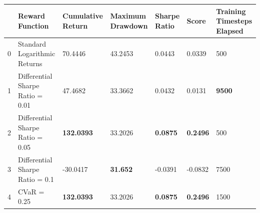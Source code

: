 \begin{tabular}{lllllll}
\toprule
 & Reward Function & Cumulative Return & Maximum Drawdown & Sharpe Ratio & Score & Training Timesteps Elapsed \\
\midrule
0 & Standard Logarithmic Returns & 70.4446 & 43.2453 & 0.0443 & 0.0339 & 500 \\
1 & Differential Sharpe Ratio = 0.01 & 47.4682 & 33.3662 & 0.0432 & 0.0131 & \textbf{9500} \\
2 & Differential Sharpe Ratio = 0.05 & \textbf{132.0393} & 33.2026 & \textbf{0.0875} & \textbf{0.2496} & 500 \\
3 & Differential Sharpe Ratio = 0.1 & -30.0417 & \textbf{31.652} & -0.0391 & -0.0832 & 7500 \\
4 & CVaR = 0.25 & \textbf{132.0393} & 33.2026 & \textbf{0.0875} & \textbf{0.2496} & 1500 \\
\bottomrule
\end{tabular}
